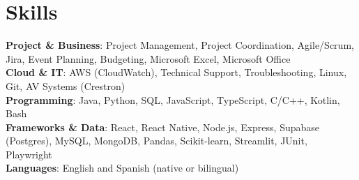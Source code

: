 \documentclass[letterpaper,11pt]{article}
\begin{document}
\section{Skills}
\begin{itemize}[leftmargin=0.15in, label={}]
    \small{\item{
      \textbf{Project \& Business}{: Project Management, Project Coordination, Agile/Scrum, Jira, Event Planning, Budgeting, Microsoft Excel, Microsoft Office} \\
      \textbf{Cloud \& IT}{: AWS (CloudWatch), Technical Support, Troubleshooting, Linux, Git, AV Systems (Crestron)} \\
      \textbf{Programming}{: Java, Python, SQL, JavaScript, TypeScript, C/C++, Kotlin, Bash} \\
      \textbf{Frameworks \& Data}{: React, React Native, Node.js, Express, Supabase (Postgres), MySQL, MongoDB, Pandas, Scikit-learn, Streamlit, JUnit, Playwright} \\
      \textbf{Languages}{: English and Spanish (native or bilingual)}
    }}
\end{itemize}
\end{document}
